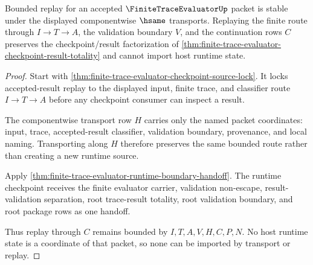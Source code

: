 \begin{theorem}
\label{thm:finite-trace-evaluator-bounded-replay-stability}
Bounded replay for an accepted $\FiniteTraceEvaluatorUp$ packet is stable under the displayed componentwise $\hsame$ transports. Replaying the finite route through $I \to T \to A$, the validation boundary $V$, and the continuation rows $C$ preserves the checkpoint/result factorization of \autoref{thm:finite-trace-evaluator-checkpoint-result-totality} and cannot import host runtime state.
\end{theorem}
\begin{proof}
Start with \autoref{thm:finite-trace-evaluator-checkpoint-source-lock}. It locks accepted-result replay to the displayed input, finite trace, and classifier route $I \to T \to A$ before any checkpoint consumer can inspect a result.

The componentwise transport row $H$ carries only the named packet coordinates: input, trace, accepted-result classifier, validation boundary, provenance, and local naming. Transporting along $H$ therefore preserves the same bounded route rather than creating a new runtime source.

Apply \autoref{thm:finite-trace-evaluator-runtime-boundary-handoff}. The runtime checkpoint receives the finite evaluator carrier, validation non-escape, result-validation separation, root trace-result totality, root validation boundary, and root package rows as one handoff.

Thus replay through $C$ remains bounded by $I,T,A,V,H,C,P,N$. No host runtime state is a coordinate of that packet, so none can be imported by transport or replay.
\end{proof}


